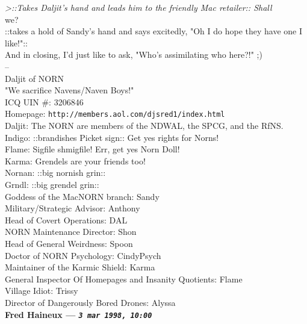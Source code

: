 \documentclass[11pt,twoside,a4paper]{article}
\begin{document}
\begin{multicols*}{2}
\emph{>::Takes Daljit's hand and leads him to the friendly Mac retailer:: Shall}~\\

we?~\\

::takes a hold of Sandy's hand and says excitedly, "Oh I do hope they have one I like!"::~\\

And in closing, I'd just like to ask, "Who's assimilating who here?!"  ;)~\\

-- ~\\
Daljit of NORN~\\
"We sacrifice Navens/Naven Boys!"~\\
ICQ UIN \#:  3206846~\\
Homepage:  \texttt{http://members.aol.com/djsred1/index.html}~\\

Daljit:  The NORN are members of the NDWAL, the SPCG, and the RfNS.~\\
Indigo:  ::brandishes Picket sign::  Get yes rights for Norns!~\\
Flame:  Sigfile shmigfile!  Err, get yes Norn Doll!~\\
Karma:  Grendels are your friends too!~\\
Nornan:  ::big nornish grin::~\\
Grndl:  ::big grendel grin::~\\

Goddess of the MacNORN branch:  Sandy~\\
Military/Strategic Advisor:  Anthony~\\
Head of Covert Operations:  DAL~\\
NORN Maintenance Director:  Shon~\\
Head of General Weirdness:  Spoon~\\
Doctor of NORN Psychology:  CindyPsych~\\
Maintainer of the Karmic Shield:  Karma~\\
General Inspector Of Homepages and Insanity Quotients:  Flame~\\
Village Idiot:  Trissy~\\
Director of Dangerously Bored Drones:  Alyssa~\\

 
		
	
		
\textbf{Fred Haineux --- \emph{\texttt{3 mar 1998, 10:00}}}~\\


\end{multicols*}
\end{document}
